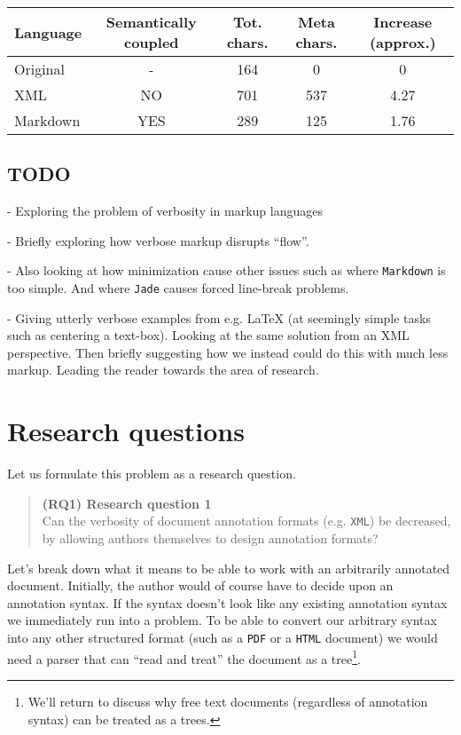 \documentclass{scrreprt}
\newcommand\researchquestionformat[1]{\begin{quote}#1\end{quote}}
\newcommand\firstresearchquestion{\researchquestionformat{%
  \textbf{(RQ1) Research question 1} \\
  Can the verbosity of document annotation formats (e.g. \texttt{XML}) be decreased, by allowing authors themselves to design annotation formats?%
}}
\begin{document}
\vspace{12pt}
\begin{tabular}{l c c c c}
Language
& Semantically coupled
& Tot. chars.
& Meta chars.
& Increase (approx.)
\\
\hline
Original & -   & 164 & 0   & 0\\
XML      & NO  & 701 & 537 & 4.27\\
Markdown & YES & 289 & 125 & 1.76
\end{tabular}
\vspace{12pt}






\section{TODO}
- Exploring the problem of verbosity in markup languages

- Briefly exploring how verbose markup disrupts ``flow''.

- Also looking at how minimization cause other issues such as where \texttt{Markdown} is too simple. And where \texttt{Jade} causes forced line-break problems.

- Giving utterly verbose examples from e.g. LaTeX (at seemingly simple tasks such as centering a text-box). Looking at the same solution from an XML perspective. Then briefly suggesting how we instead could do this with much less markup. Leading the reader towards the area of research.







\chapter{Research questions}
Let us formulate this problem as a research question.

\firstresearchquestion

Let's break down what it means to be able to work with an arbitrarily annotated document. Initially, the author would of course have to decide upon an annotation syntax. If the syntax doesn't look like any existing annotation syntax we immediately run into a problem. To be able to convert our arbitrary syntax into any other structured format (such as a \texttt{PDF} or a \texttt{HTML} document) we would need a parser that can ``read and treat'' the document as a tree\footnote{ We'll return to discuss why free text documents (regardless of annotation syntax) can be treated as a trees. }. %
\end{document}
